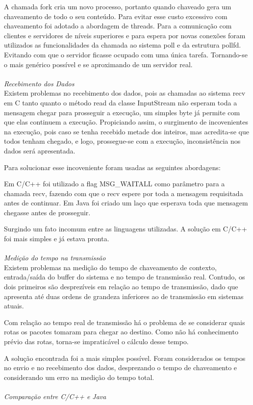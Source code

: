 \documentclass[11pt,twoside]{article}
\begin{document}
A chamada fork cria um novo processo, portanto quando chaveado gera um chaveamento de todo o seu conteúdo. Para evitar esse custo excessivo com chaveamento foi adotado a abordagem de threads.
Para a comunicação com clientes e servidores de níveis superiores e para espera por novas conexões foram utilizados as funcionalidades da chamada ao sistema poll e da estrutura pollfd. Evitando com que o servidor ficasse ocupado com uma única tarefa. Tornando-se o mais genérico possível e se aproximando de um servidor real.
\\\\
\textit{\Large{Recebimento dos Dados}}
\\

Existem problemas no recebimento dos dados, pois as chamadas ao sistema recv em C tanto quanto o método read da classe InputStream não esperam toda a mensagem chegar para prosseguir a execução, um simples byte já permite com que elas continuem a execução. Propiciando assim, o surgimento de incovenientes na execução, pois caso se tenha recebido metade dos inteiros, mas acredita-se que todos tenham chegado, e logo, prossegue-se com a execução, inconsistência nos dados será apresentada.

Para solucionar esse incoveniente foram usadas as seguintes abordagens:

Em C/C++  foi utilizado a flag MSG_WAITALL como parâmetro para a chamada recv, fazendo com que o recv espere por toda a mensagem requisitada antes de continuar. Em Java foi criado um laço que esperava toda que mensagem chegasse antes de prosseguir.

Surgindo um fato incomum entre as linguagens utilizadas. A solução em C/C++ foi mais simples e já estava pronta. 
\\\\
\textit{\Large{Medição do tempo na transmissão}}
\\

Existem problemas na medição do tempo de chaveamento de contexto, entrada/saída do buffer do sistema e no tempo de transmissão real. Contudo, os dois primeiros são desprezíveis em relação ao tempo de transmissão, dado que apresenta até duas ordens de grandeza inferiores ao de transmissão em sistemas atuais.

Com relação ao tempo real de transmissão há o problema de se considerar quais rotas os pacotes tomaram para chegar ao destino. Como não há conhecimento prévio das rotas, torna-se impraticável o cálculo desse tempo.

A solução encontrada foi a mais simples possível. Foram considerados os tempos no envio e no recebimento dos dados,  desprezando o tempo de chaveamento e considerando um erro na medição do tempo total.
\\\\
\textit{\Large{Comparação entre C/C++ e Java}}
\\
\end{document}
